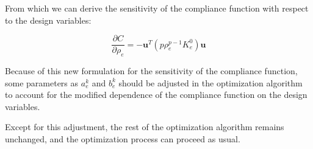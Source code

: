 From which we can derive the sensitivity of the compliance function with respect to the design variables:

\begin{equation}
    \frac{\partial C}{\partial \rho_e} = -\bm{u}^T (p \rho_e^{p-1} K_e^0) \bm{u}
    \label{eq:compliance_sensitivity}
\end{equation}

Because of this new formulation for the sensitivity of the compliance function, some parameters as $a_e^k$ and $b_e^k$ should be adjusted in the optimization algorithm to account for the modified dependence of the compliance function on the design variables.

Except for this adjustment, the rest of the optimization algorithm remains unchanged, and the optimization process can proceed as usual.